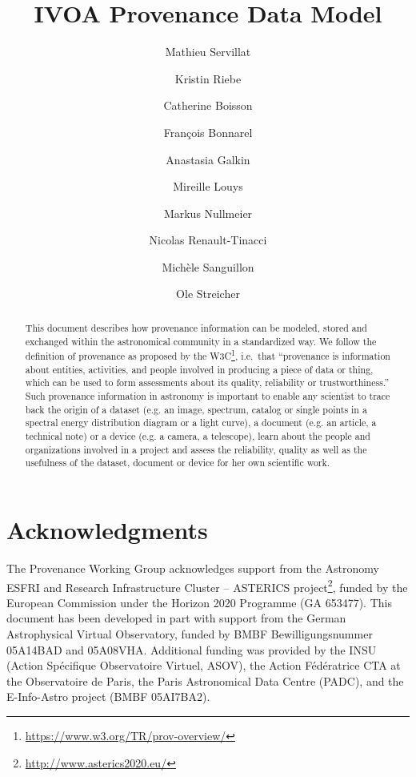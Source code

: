 \documentclass[11pt,a4paper]{ivoa}
\author{Mathieu Servillat}
\author{Kristin Riebe}
\author{Catherine Boisson}
\author{François Bonnarel}
\author{Anastasia Galkin}
\author{Mireille Louys}
\author{Markus Nullmeier}
\author{Nicolas Renault-Tinacci}
\author{Michèle Sanguillon}
\author{Ole Streicher}
\begin{document}

\lstset{escapechar=@,style=customc}

\title{IVOA Provenance Data Model}


\begin{abstract}
This document describes how provenance information can be modeled, stored and exchanged within the astronomical community in a standardized way.
We follow the definition of provenance as proposed by the W3C\footnote{\url{https://www.w3.org/TR/prov-overview/}}, i.e.~that ``provenance is information about entities, activities, and people involved in producing a piece of data or thing, which can be used to form assessments about its quality, reliability or trustworthiness.''
Such provenance information in astronomy is important to enable any scientist to trace back the origin of a dataset (e.g. an image, spectrum, catalog or single points in a spectral energy distribution diagram or a light curve), a document (e.g. an article, a technical note) or a device (e.g. a camera, a telescope), learn about the people and organizations involved in a project and assess the reliability, quality as well as the usefulness of the dataset, document or device for her own scientific work.
\end{abstract}

\section*{Acknowledgments}

The Provenance Working Group acknowledges support from the Astronomy ESFRI and Research Infrastructure Cluster – ASTERICS project\footnote{\url{http://www.asterics2020.eu/}}, funded by the European Commission under the Horizon 2020 Programme (GA 653477). This document has been developed in part with support from the German Astrophysical Virtual Observatory, funded by BMBF Bewilligungsnummer 05A14BAD and 05A08VHA. Additional funding was provided by the INSU (Action Spécifique Observatoire Virtuel, ASOV), the Action Fédératrice CTA at the Observatoire de Paris, the Paris Astronomical Data Centre (PADC), and the E-Info-Astro project (BMBF 05AI7BA2).
\end{document}
